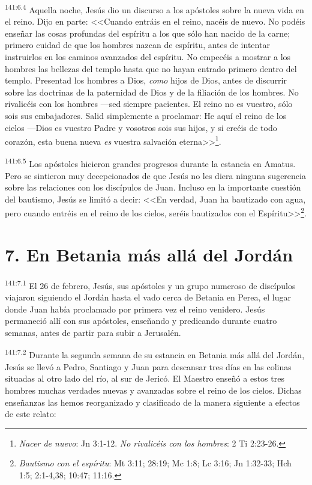 \par 
\textsuperscript{141:6.4} Aquella noche, Jesús dio un discurso a los apóstoles sobre la nueva vida en el reino. Dijo en parte: <<Cuando entráis en el reino, nacéis de nuevo. No podéis enseñar las cosas profundas del espíritu a los que sólo han nacido de la carne; primero cuidad de que los hombres nazcan de espíritu, antes de intentar instruirlos en los caminos avanzados del espíritu. No empecéis a mostrar a los hombres las bellezas del templo hasta que no hayan entrado primero dentro del templo. Presentad los hombres a Dios, \textit{como} hijos de Dios, antes de discurrir sobre las doctrinas de la paternidad de Dios y de la filiación de los hombres. No rivalicéis con los hombres ---sed siempre pacientes. El reino no es vuestro, sólo sois sus embajadores. Salid simplemente a proclamar: He aquí el reino de los cielos ---Dios es vuestro Padre y vosotros sois sus hijos, y si creéis de todo corazón, esta buena nueva \textit{es} vuestra salvación eterna>>\footnote{\textit{Nacer de nuevo}: Jn 3:1-12. \textit{No rivalicéis con los hombres}: 2 Ti 2:23-26.}.

\par 
\textsuperscript{141:6.5} Los apóstoles hicieron grandes progresos durante la estancia en Amatus. Pero se sintieron muy decepcionados de que Jesús no les diera ninguna sugerencia sobre las relaciones con los discípulos de Juan. Incluso en la importante cuestión del bautismo, Jesús se limitó a decir: <<En verdad, Juan ha bautizado con agua, pero cuando entréis en el reino de los cielos, seréis bautizados con el Espíritu>>\footnote{\textit{Bautismo con el espíritu}: Mt 3:11; 28:19; Mc 1:8; Lc 3:16; Jn 1:32-33; Hch 1:5; 2:1-4,38; 10:47; 11:16.}.

\section*{7. En Betania más allá del Jordán}
\par 
\textsuperscript{141:7.1} El 26 de febrero, Jesús, sus apóstoles y un grupo numeroso de discípulos viajaron siguiendo el Jordán hasta el vado cerca de Betania en Perea, el lugar donde Juan había proclamado por primera vez el reino venidero. Jesús permaneció allí con sus apóstoles, enseñando y predicando durante cuatro semanas, antes de partir para subir a Jerusalén.

\par 
\textsuperscript{141:7.2} Durante la segunda semana de su estancia en Betania más allá del Jordán, Jesús se llevó a Pedro, Santiago y Juan para descansar tres días en las colinas situadas al otro lado del río, al sur de Jericó. El Maestro enseñó a estos tres hombres muchas verdades nuevas y avanzadas sobre el reino de los cielos. Dichas enseñanzas las hemos reorganizado y clasificado de la manera siguiente a efectos de este relato:

